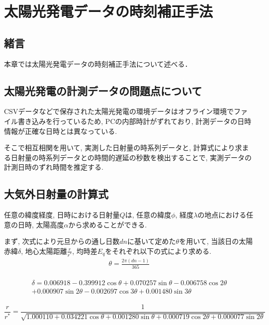 
\chapter{太陽光発電データの時刻補正手法}
\label{chap:second}

\section{緒言}
本章では太陽光発電データの時刻補正手法について述べる．


\section{太陽光発電の計測データの問題点について}
CSVデータなどで保存された太陽光発電の環境データはオフライン環境でファイル書き込みを行っているため, PCの内部時計がずれており, 計測データの日時情報が正確な日時とは異なっている.

そこで相互相関を用いて, 実測した日射量の時系列データと, 計算式により求まる日射量の時系列データとの時間的遅延の秒数を検出することで, 実測データの計測日時のずれ時間を推定する.

\section{大気外日射量の計算式}
任意の緯度経度, 日時における日射量$Q$は, 任意の緯度$\phi$, 経度$\lambda$の地点における任意の日時, 太陽高度$\alpha$から求めることができる.

まず, 次式により元旦からの通し日数$dn$に基いて定めた$\theta$を用いて, 当該日の太陽赤緯$\delta$, 地心太陽距離$\frac{r}{r^{*}}$, 均時差$E_q$をそれぞれ以下の式により求める.
\begin{eqnarray}
  \theta =  \frac{2\pi (dn-1)}{365}
\end{eqnarray}

\begin{eqnarray}
  \begin{split}
    \delta =  0.006918-0.399912\cos \theta+0.070257\sin \theta-0.006758\cos 2\theta\\
    +0.000907\sin 2\theta-0.002697\cos 3\theta+0.001480\sin 3\theta
  \end{split}
\end{eqnarray}

\begin{dmath}
  \frac{r}{r^{*}} =  \frac{1}{\sqrt{1.000110+0.034221\cos \theta+0.001280\sin \theta+0.000719\cos 2\theta+0.000077\sin 2\theta}}
\end{dmath}


